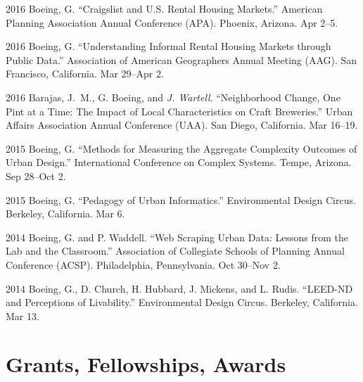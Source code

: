 \documentclass[12pt,letterpaper]{report}
\begin{document}
\begin{tablist}
\item[2016] \tab Boeing, G. \enquote{Craigslist and U.S. Rental Housing Markets.} American Planning Association Annual Conference (APA). Phoenix, Arizona. Apr 2--5.

\item[2016] \tab Boeing, G. \enquote{Understanding Informal Rental Housing Markets through Public Data.} Association of American Geographers Annual Meeting (AAG). San Francisco, California. Mar 29--Apr 2.

\item[2016] \tab Barajas, J.~M., G. Boeing, and \textit{J. Wartell}. \enquote{Neighborhood Change, One Pint at a Time: The Impact of Local Characteristics on Craft Breweries.} Urban Affairs Association Annual Conference (UAA). San Diego, California. Mar 16--19.

\item[2015] \tab Boeing, G. \enquote{Methods for Measuring the Aggregate Complexity Outcomes of Urban Design.} International Conference on Complex Systems. Tempe, Arizona. Sep 28--Oct 2.

\item[2015] \tab Boeing, G. \enquote{Pedagogy of Urban Informatics.} Environmental Design Circus. Berkeley, California. Mar 6.

\item[2014] \tab Boeing, G. and P. Waddell. \enquote{Web Scraping Urban Data: Lessons from the Lab and the Classroom.} Association of Collegiate Schools of Planning Annual Conference (ACSP). Philadelphia, Pennsylvania. Oct 30--Nov 2.

\item[2014] \tab Boeing, G., D. Church, H. Hubbard, J. Mickens, and L. Rudis. \enquote{LEED-ND and Perceptions of Livability.} Environmental Design Circus. Berkeley, California. Mar 13.

\end{tablist}



\section*{Grants, Fellowships, Awards}
\end{document}
